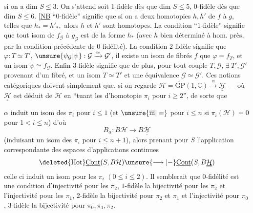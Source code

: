 si on a  dim $S\leq3$. On s'attend 
soit $1$-fidèle dès que dim $S\leq5$, $0$-fidèle
dès que dim $S\leq6$.
[\uline{NB}  ``$0$-fidèle''
 signifie
que si on a deux homotopies $h,h'$ de $f$ à $g$,
telles que $h_*=h'_*,$ alors $h$ et $h'$ sont homotopes.
La condition ``$1$-fidèle'' signifie  que tout
isom de $f_{\mathcal G}$ à $g_{\mathcal G}$
 est de la
forme $h_*$ (avec $h$ bien déterminé à hom. près,
par la condition précédente de $0$-fidélité). La
condition $2$-fidèle signifie que 
 $\varphi:T\simeq T'$,
$\unsure{\psi_{\mathcal G}|\psi}:\mathcal G\xrightarrow{\simeq}\mathcal G'$,
il existe
un isom de fibrés $f$  que $\varphi=f_T$,
et un isom $\psi\simeq f_{\mathcal G}$. Enfin $3$-fidèle signifie
que de plus, pour tout couple $T,\mathcal G$,
$\exists\ T',\mathcal G'$ provenant d'un fibré, 
et un isom $T\simeq T'$ et une équivalence
$\mathcal G\simeq\mathcal G'$. Ces notions catégoriques
doivent  simplement que, si
on regarde $\mathcal H=\widetilde{\mathrm{GP}}(1,\mathbb C)
\xrightarrow{\alpha}\underline{\underline{\mathcal H}}$
--- où $\underline{\underline{\mathcal H}}$
est déduit de $\mathcal H$ en ``tuant les 
d'homotopie $\pi_i$ pour $i\geq2$'', de sorte que

$\alpha$ induit un isom des $\pi_i$ pour $i\leq1$
(et $\unsure{\overline{\mathrm m}|=}$ pour $i\leq n$ si
$\pi_i(\mathcal H)=0$ pour $1<i\leq n$)
 d'où
\[
B_\alpha:B\mathcal H\longrightarrow B\underline{\underline{\mathcal H}}
\]
(induisant un isom des $\pi_i$ pour $i\leq n+1$),
alors prenant pour   $S$ l'application
correspondante des espaces d'applications continues
\[
\deleted{\mathrm{Hot}}
\underline{\mathrm{Cont}}(S,B\mathcal H)
\unsure{\longrightarrow|{-}}
\underline{\mathrm{Cont}}(S,B\underline{\underline{\mathcal H}})
\]
celle ci induit un isom pour les
$\pi_i$ $(0\leq i\leq2)$.  Il semblerait que
$0$-fidélité est une condition d'injectivité
pour les $\pi_2$, $1$-fidèle la bijectivité pour les
$\pi_2$ et l'injectivité pour les $\pi_1$, $2$-fidèle
la bijectivité pour $\pi_2$ et $\pi_1$ et l'injectivité
pour $\pi_0$, $3$-fidèle la bijectivité pour $\pi_0,\pi_1,\pi_2$.

